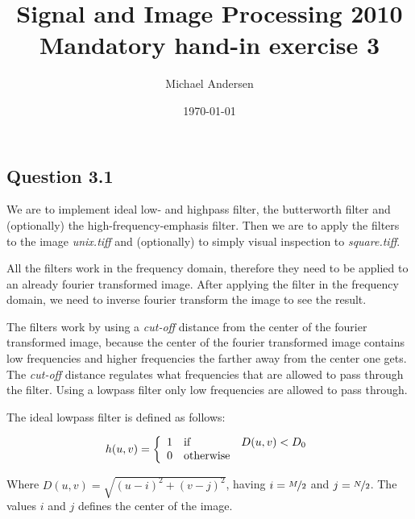 \documentclass[a4paper, 10pt, final]{article}
\title{Signal and Image Processing 2010 \\ Mandatory hand-in exercise 3}
\author{Michael Andersen}
\date{\today}
\begin{document}
\maketitle

\subsection*{Question 3.1}

We are to implement ideal low- and highpass filter, the butterworth
filter and (optionally) the high-frequency-emphasis filter. Then we
are to apply the filters to the image \emph{unix.tiff} and
(optionally) to simply visual inspection to \emph{square.tiff}.

All the filters work in the frequency domain, therefore they need to
be applied to an already fourier transformed image. After applying the
filter in the frequency domain, we need to inverse fourier transform
the image to see the result.

The filters work by using a \textit{cut-off} distance from the center
of the fourier transformed image, because the center of the fourier
transformed image contains low frequencies and higher frequencies the
farther away from the center one gets. The \textit{cut-off} distance
regulates what frequencies that are allowed to pass through the
filter. Using a lowpass filter only low frequencies are allowed to
pass through.

The ideal lowpass filter is defined as follows:

\begin{equation*}
    h(u, v) = \left\{ \begin{array}{l l l}
        1 & \mbox{if} & D(u, v) < D_0\\
        0 & \mbox{otherwise} &
    \end{array}\right.
\end{equation*}

Where $D(u, v) = \sqrt{(u - i)^{2} + (v - j)^{2}}$, having $i =
\nicefrac{M}{2}$ and $j = \nicefrac{N}{2}$. The values $i$ and $j$
defines the center of the image.
\end{document}
